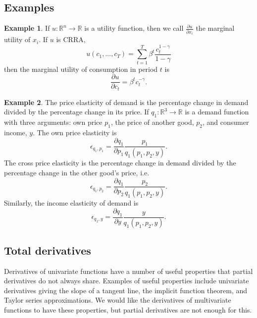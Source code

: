\documentclass[12pt,reqno]{amsart}
\theoremstyle{definition}
\newtheorem{example}{Example}[section]
\def\R{\mathbb{R}}
\renewcommand{\to}{{\rightarrow}}
\begin{document}
\subsection{Examples}
\begin{example}
  If $u:\R^n \to \R$ is a utility function, then we call
  $\frac{\partial u}{\partial x_i}$ the marginal utility of $x_i$.  
  If $u$ is CRRA, 
  \[u(c_1,...,c_T) =
  \sum_{t=1}^T \beta^t \frac{c_t^{1-\gamma}}{1-\gamma} \]
  then  the marginal utility of consumption in period $t$ is 
  \[ \frac{\partial u}{\partial c_t} = \beta^t c_t^{-\gamma}. \]
\end{example}

\begin{example}
  The price elasticity of demand is the percentage change in demand
  divided by the percentage change in its price. If $q_1:\R^3 \to \R$ is
  a demand function with three arguments: own price $p_1$, the price
  of another good, $p_2$, and consumer income, $y$.  The own price
  elasticity is 
  \[ \epsilon_{q_1,p_1} = \frac{\partial q_1}{\partial p_1}
  \frac{p_1}{q_1(p_1,p_2,y)}. \]
  The cross price elasticity is the percentage change in demand
  divided by the percentage change in the other good's price, i.e.
  \[ \epsilon_{q_1,p_2} = \frac{\partial q_1}{\partial p_2}
  \frac{p_2}{q_1(p_1,p_2,y)}. \]
  Similarly, the income elasticity of demand is
  \[ \epsilon_{q_1,y} = \frac{\partial q_1}{\partial y}
  \frac{y}{q_1(p_1,p_2,y)}. \]
\end{example}

\subsection{Total derivatives}

Derivatives of univariate functions have a number of useful properties
that partial derivatives do not always share. Examples of useful
properties include univariate derivatives giving the slope of a
tangent line, the implicit function theorem, and Taylor series
approximations. We would like the derivatives of multivariate
functions to have these properties, but partial derivatives are not
enough for this.
\end{document}
